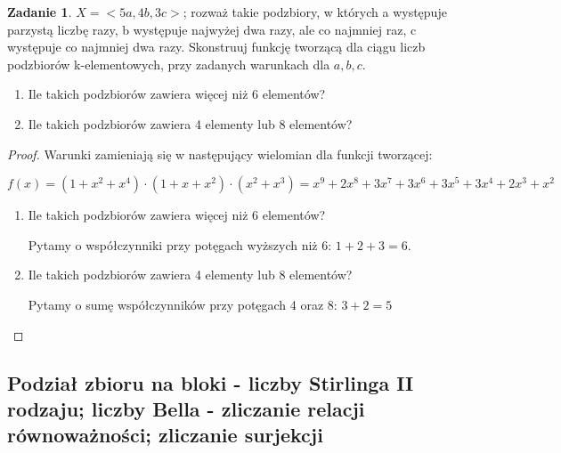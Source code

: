 \documentclass[11pt]{article}
\theoremstyle{definition}
\newtheorem{zadanie}{Zadanie}
\numberwithin{zadanie}{subsection}
\begin{document}
\begin{zadanie}

    $X = <5a,4b,3c>$; rozważ takie podzbiory, w których a występuje parzystą liczbę razy,
    b występuje najwyżej dwa razy, ale co najmniej raz, c występuje co najmniej dwa razy.
    Skonstruuj funkcję tworzącą dla ciągu liczb podzbiorów k-elementowych, przy zadanych
    warunkach dla $a, b, c.$
    \begin{enumerate}
        \item Ile takich podzbiorów zawiera więcej niż 6 elementów?
        \item Ile takich podzbiorów zawiera 4 elementy lub 8 elementów?
    \end{enumerate}
\end{zadanie}
\begin{proof}
    Warunki zamieniają się w następujący wielomian dla funkcji tworzącej:

    $$f(x) = (1+x^2+x^4)\cdot(1+x+x^2)\cdot(x^2+x^3) = x^9 + 2 x^8 + 3 x^7 + 3 x^6 + 3 x^5 + 3 x^4 + 2 x^3 + x^2$$

    \begin{enumerate}
        \item Ile takich podzbiorów zawiera więcej niż 6 elementów?

              Pytamy o współczynniki przy potęgach wyższych niż 6: $1+2+3 = 6$.

        \item Ile takich podzbiorów zawiera 4 elementy lub 8 elementów?

              Pytamy o sumę współczynników przy potęgach 4 oraz 8: $3+2 = 5$
    \end{enumerate}
\end{proof}

\subsection{Podział zbioru na bloki - liczby Stirlinga II rodzaju; liczby Bella - zliczanie relacji równoważności; zliczanie surjekcji}
\end{document}
